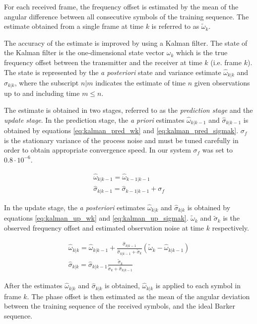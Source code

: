 For each received frame, the frequency offset is estimated by the mean of the angular difference between all consecutive symbols of the training sequence. The estimate obtained from a single frame at time $k$  is referred to as $\widetilde{\omega}_k$.  

The accuracy of the estimate is improved by using a Kalman filter. The state of the Kalman filter is the one-dimensional state vector $\omega_k$ which is the true frequency offset between the transmitter and the receiver at time $k$ (i.e. frame $k$). The state is represented by the \textit{a posteriori} state and variance estimate $\widehat{\omega}_{k | k}$ and $\widehat{\sigma}_{k | k}$, where the subscript $n | m$ indicates the estimate of time $n$ given observations up to and including time $m \leq n$. 

The estimate is obtained in two stages, referred to as the \textit{prediction stage} and the \textit{update stage}. In the prediction stage, the \textit{a priori} estimates $\widehat{\omega}_{k | k-1}$ and $\widehat{\sigma}_{k | k-1}$ is obtained by equations \ref{eq:kalman_pred_wk} and \ref{eq:kalman_pred_sigmak}. $\sigma_f$ is the stationary variance of the process noise and must be tuned carefully in order to obtain appropriate convergence speed. In our system $\sigma_f$ was set to $0.8\cdot 10^{-6}$.  

\begin{gather}
\widehat{\omega}_{k | k-1} = \widehat{\omega}_{k-1 | k-1}  \label{eq:kalman_pred_wk} \\
\widehat{\sigma}_{k | k-1} = \widehat{\sigma}_{k-1 | k-1} + \sigma_f \label{eq:kalman_pred_sigmak} 
\end{gather} 

In the update stage, the \textit{a posteriori} estimates $\widehat{\omega}_{k | k}$ and $\widehat{\sigma}_{k | k}$ is obtained by equations \ref{eq:kalman_up_wk} and \ref{eq:kalman_up_sigmak}. $\widetilde{\omega}_k$ and $\widetilde{\sigma}_{k}$ is the observed frequency offset and estimated observation noise at time $k$ respectively.

\begin{gather}
\widehat{\omega}_{k | k} = \widehat{\omega}_{k | k-1} + \frac{\widehat{\sigma}_{k | k-1}}{\widehat{\sigma}_{k | k-1} + \widetilde{\sigma}_{k}} ( \widetilde{\omega}_{k} - \widehat{\omega}_{k | k-1} )  \label{eq:kalman_up_wk} \\
\widehat{\sigma}_{k | k} = \widehat{\sigma}_{k | k-1} \frac{\widetilde{\sigma}_{k}}{\widetilde{\sigma}_{k} + \widehat{\sigma}_{k | k-1}  } \label{eq:kalman_up_sigmak} 
\end{gather} 

After the estimates $\widehat{\omega}_{k | k}$ and $\widehat{\sigma}_{k | k}$ is obtained, $\widehat{\omega}_{k | k}$ is applied to each symbol in frame $k$. The phase offset is then estimated as the mean of the angular deviation between the training sequence of the received symbols, and the ideal Barker sequence.


